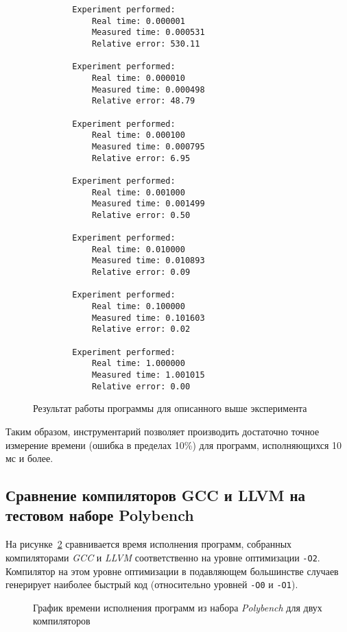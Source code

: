 \begin{figure}[H]
    \fontsize{10}{12}
    \begin{verbatim}
        Experiment performed:
            Real time: 0.000001
            Measured time: 0.000531
            Relative error: 530.11
        
        Experiment performed:
            Real time: 0.000010
            Measured time: 0.000498
            Relative error: 48.79
        
        Experiment performed:
            Real time: 0.000100
            Measured time: 0.000795
            Relative error: 6.95
        
        Experiment performed:
            Real time: 0.001000
            Measured time: 0.001499
            Relative error: 0.50
        
        Experiment performed:
            Real time: 0.010000
            Measured time: 0.010893
            Relative error: 0.09
        
        Experiment performed:
            Real time: 0.100000
            Measured time: 0.101603
            Relative error: 0.02
        
        Experiment performed:
            Real time: 1.000000
            Measured time: 1.001015
            Relative error: 0.00
    \end{verbatim}
    \caption{Результат работы программы для описанного выше эксперимента}
    \label{img:default_calibration}
\end{figure}

Таким образом, инструментарий позволяет производить достаточно точное измерение времени (ошибка в пределах 10\%) для программ, исполняющихся 10 мс и более.


\subsection{Сравнение компиляторов GCC и LLVM на тестовом наборе Polybench}
\label{series-llvm-vs-gcc}
На рисунке~\ref{img:gcc-vs-clang} сравнивается время исполнения программ, собранных компиляторами \textit{GCC} и \textit{LLVM} соответственно на уровне оптимизации \texttt{-O2}. Компилятор на этом уровне оптимизации в подавляющем большинстве случаев генерирует наиболее быстрый код (относительно уровней \texttt{-O0} и \texttt{-O1}).

\begin{figure}[!bH]
    \caption{График времени исполнения программ из набора \textit{Polybench} для двух компиляторов}
    \label{img:gcc-vs-clang}
\end{figure}

